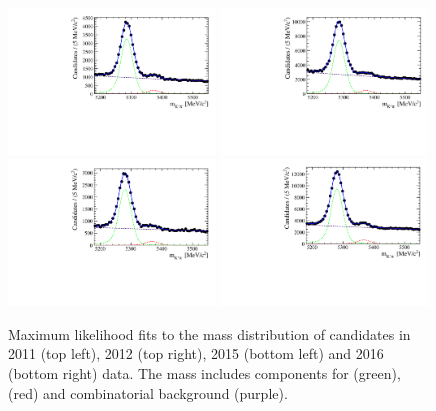 \begin{figure}[t!]
  \centering
    \includegraphics[width=0.49\textwidth]{./Figs/LifetimeMeasurement/Bd2KPi_2011_mass_fit.pdf}
    \includegraphics[width=0.49\textwidth]{./Figs/LifetimeMeasurement/Bd2KPi_2012_mass_fit.pdf}
    \includegraphics[width=0.49\textwidth]{./Figs/LifetimeMeasurement/Bd2KPi_2015_mass_fit.pdf}
    \includegraphics[width=0.49\textwidth]{./Figs/LifetimeMeasurement/Bd2KPi_2016_mass_fit.pdf}
  \caption{Maximum likelihood fits to the mass distribution of \bdkpi candidates in 2011 (top left), 2012 (top right), 2015 (bottom left) and 2016 (bottom right) data. The mass \pdf includes components for \bdkpi (green), \bskpi (red) and combinatorial background (purple).}
  \label{fig:ntracksmassifts}
\end{figure}
\FloatBarrier




